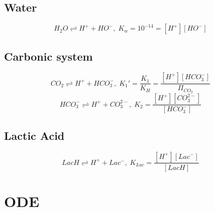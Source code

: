 \documentclass{revtex4}
\begin{document}
\subsection{Water}
\begin{equation}
	H_2O \rightleftharpoons H^+ + HO^-, \; K_w = 10^{-14} = \left[H^+\right]\left[HO^-\right]
\end{equation}	

\subsection{Carbonic system}
\begin{equation}
	CO_2 \rightleftharpoons H^+ + HCO_3^-, \; K_1' = \dfrac{K_1}{K_H} = \dfrac{\left[H^+\right]\left[HCO_3^-\right]}{\Pi_{CO_2}}
\end{equation}
\begin{equation}
	HCO_3^- \rightleftharpoons H^+ + CO_3^{2-}, \; K_2  = \dfrac{\left[H^+\right]\left[CO_3^{2-}\right]}{\left[HCO_3^-\right]}
\end{equation}
\subsection{Lactic Acid}
\begin{equation}
	LacH \rightleftharpoons H^+ + Lac^-, \; K_{Lac} = \dfrac{\left[H^+\right]\left[Lac^-\right]}{\left[LacH\right]}
\end{equation}

\section{ODE}
\end{document}
